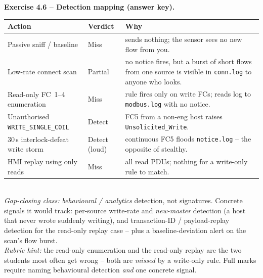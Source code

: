 \documentclass[11pt,a4paper]{article}
\begin{document}
\begin{solutionbox}
\textbf{Exercise 4.6 -- Detection mapping (answer key).}\\[2pt]
\par\begin{tabular}{@{}p{5.2cm}p{2.4cm}p{6.0cm}@{}}
\toprule
\textbf{Action} & \textbf{Verdict} & \textbf{Why} \\
\midrule
Passive sniff / baseline & Miss & sends nothing; the sensor sees no new flow from you. \\
Low-rate connect scan & Partial & no notice fires, but a burst of short flows from one source is
visible in \texttt{conn.log} to anyone who looks. \\
Read-only FC~1--4 enumeration & Miss & rule fires only on write FCs; reads log to
\texttt{modbus.log} with no notice. \\
Unauthorised \texttt{WRITE\_SINGLE\_COIL} & Detect & FC5 from a non-eng host raises
\texttt{Unsolicited\_Write}. \\
30\,s interlock-defeat write storm & Detect (loud) & continuous FC5 floods \texttt{notice.log} --
the opposite of stealthy. \\
HMI replay using only reads & Miss & all read PDUs; nothing for a write-only rule to match. \\
\bottomrule
\end{tabular}\\[3pt]
\emph{Gap-closing class:} \emph{behavioural / analytics} detection, not signatures. Concrete signals
it would track: per-source write-rate and \emph{new-master} detection (a host that never wrote
suddenly writing), and transaction-ID / payload-replay detection for the read-only replay case --
plus a baseline-deviation alert on the scan's flow burst.\\[2pt]
\emph{Rubric hint:} the read-only enumeration and the read-only replay are the two students most
often get wrong -- both are \emph{missed} by a write-only rule. Full marks require naming
behavioural detection \emph{and} one concrete signal.
\end{solutionbox}
\end{document}
